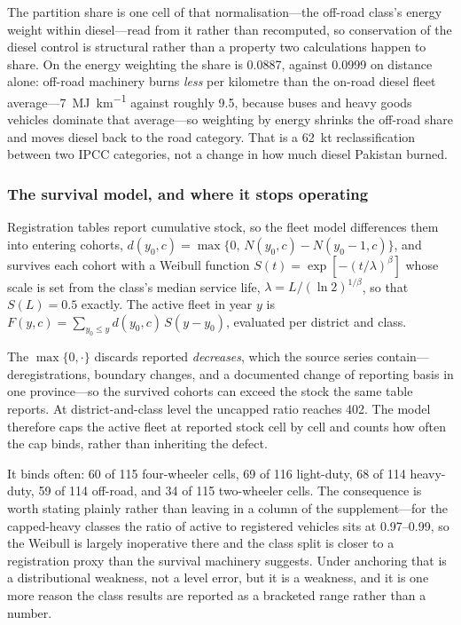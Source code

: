 The partition share is one cell of that normalisation---the off-road class's energy
weight within diesel---read from it rather than recomputed, so conservation of the
diesel control is structural rather than a property two calculations happen to share.
On the energy weighting the share is \num{0.0887}, against \num{0.0999} on distance
alone: off-road machinery burns \emph{less} per kilometre than the on-road diesel fleet
average---\SI{7}{\mega\joule\per\kilo\metre} against roughly \SI{9.5}{}, because buses
and heavy goods vehicles dominate that average---so weighting by energy shrinks the
off-road share and moves diesel back to the road category. That is a
\SI{62}{\kilo\tonne} reclassification between two IPCC categories, not a change in how
much diesel Pakistan burned.

\subsubsection{The survival model, and where it stops operating}

Registration tables report cumulative stock, so the fleet model differences them into
entering cohorts, $d(y_0,c) = \max\{0,\, N(y_0,c) - N(y_0-1,c)\}$, and survives each
cohort with a Weibull function $S(t) = \exp\!\left[-(t/\lambda)^{\beta}\right]$ whose
scale is set from the class's median service life, $\lambda = L/(\ln 2)^{1/\beta}$, so
that $S(L) = 0.5$ exactly. The active fleet in year $y$ is $F(y,c) = \sum_{y_0 \le y}
d(y_0,c)\, S(y-y_0)$, evaluated per district and class.

The $\max\{0,\cdot\}$ discards reported \emph{decreases}, which the source series
contain---deregistrations, boundary changes, and a documented change of reporting basis
in one province---so the survived cohorts can exceed the stock the same table reports.
At district-and-class level the uncapped ratio reaches 402. The model therefore caps the
active fleet at reported stock cell by cell and counts how often the cap binds, rather
than inheriting the defect.

It binds often: 60 of 115 four-wheeler cells, 69 of 116 light-duty, 68 of 114
heavy-duty, 59 of 114 off-road, and 34 of 115 two-wheeler cells. The consequence is
worth stating plainly rather than leaving in a column of the supplement---for the
capped-heavy classes the ratio of active to registered vehicles sits at 0.97--0.99, so
the Weibull is largely inoperative there and the class split is closer to a
registration proxy than the survival machinery suggests. Under anchoring that is a
distributional weakness, not a level error, but it is a weakness, and it is one more
reason the class results are reported as a bracketed range rather than a number.

